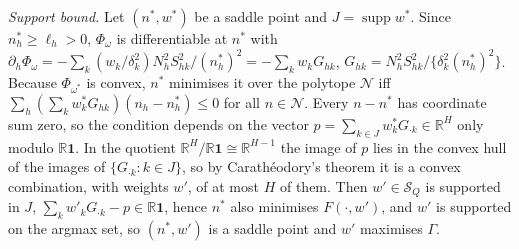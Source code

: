 \emph{Support bound.} Let $(n^\ast,w^\ast)$ be a saddle point and $J=\operatorname{supp}w^\ast$. Since $n^\ast_h\ge\ell_h>0$, $\Phi_{\omega}$ is differentiable at $n^\ast$ with $\partial_h\Phi_\omega=-\sum_k(w_k/\delta_k^2)N_h^2S^2_{hk}/(n^\ast_h)^2=-\sum_kw_kG_{hk}$, $G_{hk}=N_h^2S^2_{hk}/\{\delta_k^2(n^\ast_h)^2\}$. Because $\Phi_{\omega^\ast}$ is convex, $n^\ast$ minimises it over the polytope $\mathcal N$ iff $\sum_h(\sum_kw^\ast_kG_{hk})(n_h-n^\ast_h)\le0$ for all $n\in\mathcal N$. Every $n-n^\ast$ has coordinate sum zero, so the condition depends on the vector $p=\sum_{k\in J}w^\ast_kG_{\cdot k}\in\mathbb R^H$ only modulo $\mathbb R\mathbf 1$. In the quotient $\mathbb R^H/\mathbb R\mathbf1\cong\mathbb R^{H-1}$ the image of $p$ lies in the convex hull of the images of $\{G_{\cdot k}:k\in J\}$, so by Carath\'eodory's theorem it is a convex combination, with weights $w'$, of at most $H$ of them. Then $w'\in\mathcal S_Q$ is supported in $J$, $\sum_kw'_kG_{\cdot k}-p\in\mathbb R\mathbf1$, hence $n^\ast$ also minimises $F(\cdot,w')$, and $w'$ is supported on the argmax set, so $(n^\ast,w')$ is a saddle point and $w'$ maximises $\Gamma$.

